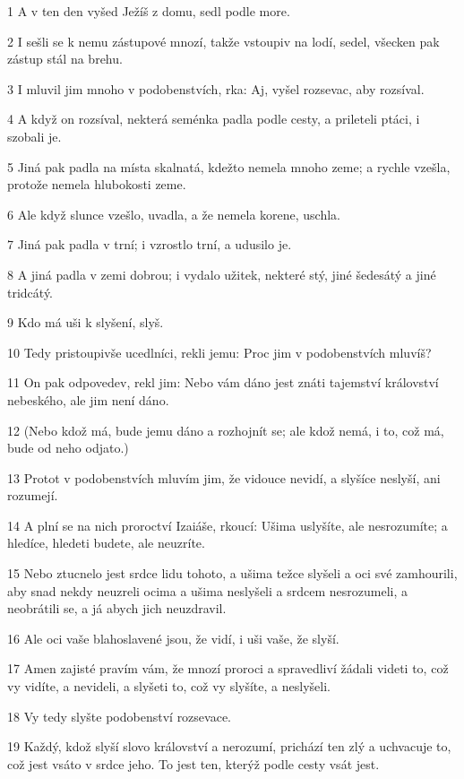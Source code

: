 \par 1 A v ten den vyšed Ježíš z domu, sedl podle more.
\par 2 I sešli se k nemu zástupové mnozí, takže vstoupiv na lodí, sedel, všecken pak zástup stál na brehu.
\par 3 I mluvil jim mnoho v podobenstvích, rka: Aj, vyšel rozsevac, aby rozsíval.
\par 4 A když on rozsíval, nekterá seménka padla podle cesty, a prileteli ptáci, i szobali je.
\par 5 Jiná pak padla na místa skalnatá, kdežto nemela mnoho zeme; a rychle vzešla, protože nemela hlubokosti zeme.
\par 6 Ale když slunce vzešlo, uvadla, a že nemela korene, uschla.
\par 7 Jiná pak padla v trní; i vzrostlo trní, a udusilo je.
\par 8 A jiná padla v zemi dobrou; i vydalo užitek, nekteré stý, jiné šedesátý a jiné tridcátý.
\par 9 Kdo má uši k slyšení, slyš.
\par 10 Tedy pristoupivše ucedlníci, rekli jemu: Proc jim v podobenstvích mluvíš?
\par 11 On pak odpovedev, rekl jim: Nebo vám dáno jest znáti tajemství království nebeského, ale jim není dáno.
\par 12 (Nebo kdož má, bude jemu dáno a rozhojnít se; ale kdož nemá, i to, což má, bude od neho odjato.)
\par 13 Protot v podobenstvích mluvím jim, že vidouce nevidí, a slyšíce neslyší, ani rozumejí.
\par 14 A plní se na nich proroctví Izaiáše, rkoucí: Ušima uslyšíte, ale nesrozumíte; a hledíce, hledeti budete, ale neuzríte.
\par 15 Nebo ztucnelo jest srdce lidu tohoto, a ušima težce slyšeli a oci své zamhourili, aby snad nekdy neuzreli ocima a ušima neslyšeli a srdcem nesrozumeli, a neobrátili se, a já abych jich neuzdravil.
\par 16 Ale oci vaše blahoslavené jsou, že vidí, i uši vaše, že slyší.
\par 17 Amen zajisté pravím vám, že mnozí proroci a spravedliví žádali videti to, což vy vidíte, a nevideli, a slyšeti to, což vy slyšíte, a neslyšeli.
\par 18 Vy tedy slyšte podobenství rozsevace.
\par 19 Každý, kdož slyší slovo království a nerozumí, prichází ten zlý a uchvacuje to, což jest vsáto v srdce jeho. To jest ten, kterýž podle cesty vsát jest.
